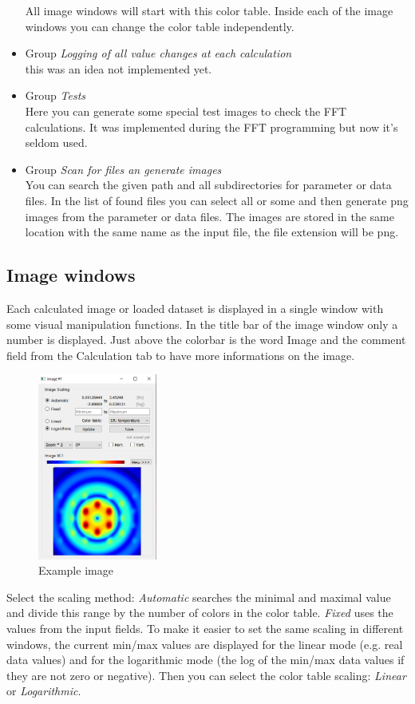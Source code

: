 \documentclass[11pt]{article} %
\begin{document}
\begin{itemize}
	All image windows will start with this color table. Inside each of the image windows you can change the color table independently.
\item Group {\it Logging of all value changes at each calculation} \\
	this was an idea not implemented yet.
\item Group {\it Tests} \\
	Here you can generate some special test images to check the FFT calculations. It was implemented during the FFT programming but now it's seldom used.
\item Group {\it Scan for files an generate images} \\
	You can search the given path and all subdirectories for parameter or data files. In the list of found files you can select all or some and then generate png images from the parameter or data files. The images are stored in the same location with the same name as the input file, the file extension will be png.
\end{itemize}


\subsection{Image windows}

Each calculated image or loaded dataset is displayed in a single window with some visual manipulation functions. In the title bar of the image window only a number is displayed. Just above the colorbar is the word Image and the comment field from the Calculation tab to have more informations on the image.
\begin{figure}
  \begin{center}
    \includegraphics[width=0.35\textwidth]{img-bct.png}
  \end{center}
 \caption{Example image}
 \label{fig:img1}
\end{figure}
Select the scaling method: {\it Automatic} searches the minimal and maximal value and divide this range by the number of colors in the color table. {\it Fixed} uses the values from the input fields. To make it easier to set the same scaling in different windows, the current min/max values are displayed for the linear mode (e.g. real data values) and for the logarithmic mode (the log of the min/max data values if they are not zero or negative). Then you can select the color table scaling: {\it Linear} or {\it Logarithmic}.
\end{document}
